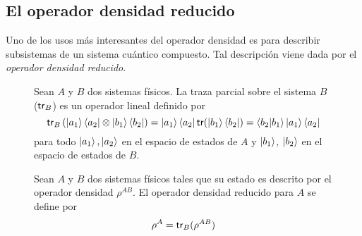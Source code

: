\subsection{El operador densidad reducido}
Uno de los usos más interesantes del operador densidad es para describir
subsistemas de un sistema cuántico compuesto. Tal descripción viene dada por el
\emph{operador densidad reducido}.

\begin{figure}[H]
\begin{definicion}
  Sean $A$ y $B$ dos sistemas físicos. La traza parcial sobre el sistema $B$ ($\mathsf{tr}_B$) es un operador lineal definido por
  \[
    \mathsf{tr}_B\left(\ket{a_1}\bra{a_2}\otimes\ket{b_1}\bra{b_2}\right) =
    \ket{a_1}\bra{a_2}\mathsf{tr}(\ket{b_1}\bra{b_2})=\braket{b_2|b_1}\ket{a_1}\bra{a_2}
  \]
  para todo $\ket{a_1},\ket{a_2}$ en el espacio de estados de $A$ y $\ket{b_1}$,
  $\ket{b_2}$ en el espacio de estados de $B$.
\end{definicion}
\end{figure}
\begin{figure}[H]
\begin{definicion}
  Sean $A$ y $B$ dos sistemas físicos tales que su estado es descrito por el
  operador densidad $\rho^{AB}$. El operador densidad reducido para $A$ se
  define por
  \[
    \rho^A = \mathsf{tr}_B(\rho^{AB})
  \]
\end{definicion}
\end{figure}

